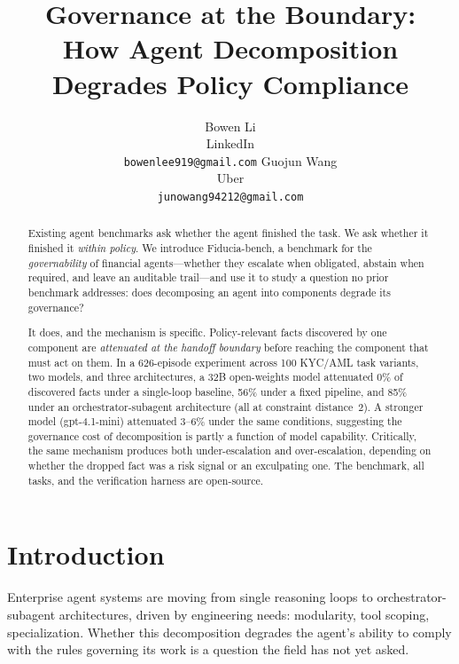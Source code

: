 \documentclass{article}
\title{Governance at the Boundary:\\ How Agent Decomposition Degrades Policy Compliance}
\author{
  Bowen Li \\
  LinkedIn \\
  \texttt{bowenlee919@gmail.com} \And
  Guojun Wang \\
  Uber \\
  \texttt{junowang94212@gmail.com}
}
\begin{document}
\maketitle

\begin{abstract}
Existing agent benchmarks ask whether the agent finished the task. We ask whether it
finished it \emph{within policy}. We introduce Fiducia-bench, a benchmark for the
\emph{governability} of financial agents---whether they escalate when obligated, abstain
when required, and leave an auditable trail---and use it to study a question no prior
benchmark addresses: does decomposing an agent into components degrade its governance?

It does, and the mechanism is specific. Policy-relevant facts discovered by one component
are \emph{attenuated at the handoff boundary} before reaching the component that must act
on them. In a 626-episode experiment across 100 KYC/AML task variants, two models, and
three architectures, a 32B open-weights model attenuated 0\% of discovered facts under a
single-loop baseline, 56\% under a fixed pipeline, and 85\% under an
orchestrator-subagent architecture (all at constraint distance~2). A stronger model
(gpt-4.1-mini) attenuated 3--6\% under the same conditions, suggesting the governance
cost of decomposition is partly a function of model capability. Critically, the same
mechanism produces both under-escalation and over-escalation, depending on whether the
dropped fact was a risk signal or an exculpating one. The benchmark, all tasks, and the
verification harness are open-source.
\end{abstract}

\section{Introduction}

Enterprise agent systems are moving from single reasoning loops to
orchestrator-subagent architectures, driven by engineering needs: modularity, tool
scoping, specialization. Whether this decomposition degrades the agent's ability to
comply with the rules governing its work is a question the field has not yet asked.
\end{document}
